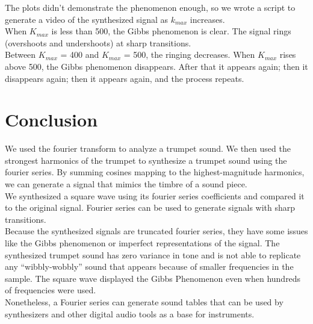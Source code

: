 \documentclass[11pt]{article}
\begin{document}
The plots didn't demonstrate the phenomenon enough,
so we wrote a script to generate a video of the synthesized signal
as $k_{max}$ increases.\\

When $K_{max}$ is less than 500, the Gibbs phenomenon is clear.
The signal rings (overshoots and undershoots) at sharp transitions.\\

Between $K_{max}$ = 400 and $K_{max}$ = 500, the ringing decreases.
When $K_{max}$ rises above 500, the Gibbs phenomenon disappears.
After that it appears again; then it disappears again; 
then it appears again, and the process repeats.

\begin{framed}
	
\end{framed}

\section{Conclusion}

We used the fourier transform to analyze a trumpet sound.
We then used the strongest harmonics of the trumpet to synthesize a trumpet sound using the fourier series.
By summing cosines mapping to the highest-magnitude harmonics, we can generate a signal that mimics the timbre of a sound piece.\\

We synthesized a square wave using its fourier series coefficients and compared it to the original signal.
Fourier series can be used to generate signals with sharp transitions.\\

Because the synthesized signals are truncated fourier series, they have some issues
like the Gibbs phenomenon or imperfect representations of the signal.
The synthesized trumpet sound has zero variance in tone and is not able to replicate any ``wibbly-wobbly'' sound that appears because of smaller frequencies in the sample.
The square wave displayed the Gibbs Phenomenon even when hundreds of frequencies were used.\\

Nonetheless, a Fourier series can generate sound tables that can be used by synthesizers and other digital audio tools as a base for instruments.
\end{document}
